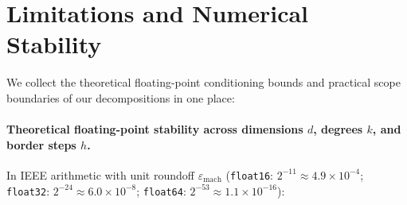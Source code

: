 \documentclass[11pt,a4paper]{article}
\theoremstyle{plain}
\theoremstyle{definition}
\begin{document}
\section{Limitations and Numerical Stability}\label{sec:limitations}

We collect the theoretical floating-point conditioning bounds and practical scope boundaries of our decompositions in one place:

\paragraph{Theoretical floating-point stability across dimensions $d$, degrees $k$, and border steps $h$.}
In IEEE arithmetic with unit roundoff $\varepsilon_{\mathrm{mach}}$ (\texttt{float16}: $2^{-11} \approx 4.9 \times 10^{-4}$; \texttt{float32}: $2^{-24} \approx 6.0 \times 10^{-8}$; \texttt{float64}: $2^{-53} \approx 1.1 \times 10^{-16}$):
\end{document}
